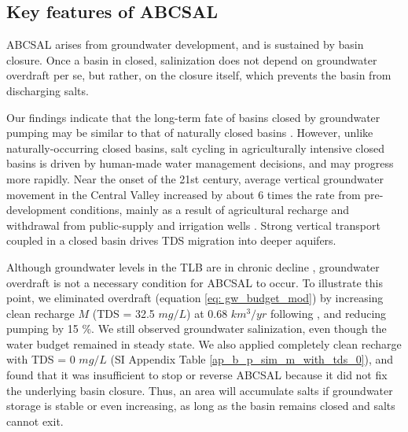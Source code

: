 \subsection{Key features of ABCSAL}
\label{ss_4_2}


ABCSAL arises from groundwater development, and is sustained by basin closure. Once a basin in closed, salinization does not depend on groundwater overdraft per se, but rather, on the closure itself, which prevents the basin from discharging salts.

Our findings indicate that the long-term fate of basins closed by groundwater pumping may be similar to that of naturally closed basins \citep{Hardie1970, Jones1978}. However, unlike naturally-occurring closed basins, salt cycling in agriculturally intensive closed basins is driven by human-made water management decisions, and may progress more rapidly. Near the onset of the 21st century, average vertical groundwater movement in the Central Valley increased by about 6 times the rate from pre-development conditions, mainly as a result of agricultural recharge and withdrawal from public-supply and irrigation wells \citep{Williamson1989}. Strong vertical transport coupled in a closed basin drives TDS migration into deeper aquifers.

Although groundwater levels in the TLB are in chronic decline \citep{Scanlon2012}, groundwater overdraft is not a necessary condition for ABCSAL to occur. To illustrate this point, we eliminated overdraft (equation \ref{eq: gw_budget_mod}) by increasing clean recharge $M$ (TDS = 32.5 $mg/L$) at 0.68 $km^3/yr$ following \cite{Hanak2019}, and reducing pumping by 15 \%. We still observed groundwater salinization, even though the water budget remained in steady state. We also applied completely clean recharge with TDS = 0 $mg/L$ (SI Appendix Table \ref{ap_b_p_sim_m_with_tds_0}), and found that it was insufficient to stop or reverse ABCSAL because it did not fix the underlying basin closure. Thus, an area will accumulate salts if groundwater storage is stable or even increasing, as long as the basin remains closed and salts cannot exit.  

